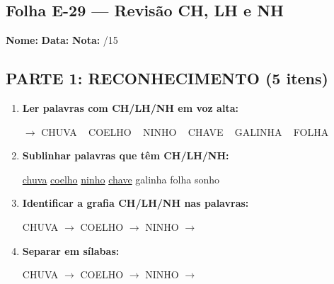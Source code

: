 \subsection{Folha E-29 --- Revisão CH, LH e NH}
\begin{exercicio}



\noindent\textbf{Nome:} \underline{\hspace{3.2cm}} \quad \textbf{Data:} \underline{\hspace{1.6cm}} \quad \textbf{Nota:} \underline{\hspace{0.9cm}}/15


\subsection*{PARTE 1: RECONHECIMENTO (5 itens)}

\begin{enumerate}

  \item \textbf{Ler palavras com CH/LH/NH em voz alta:}
  \begin{center}
  $\rightarrow$ CHUVA ~ COELHO ~ NINHO ~ CHAVE ~ GALINHA ~ FOLHA
  \end{center}

  \item \textbf{Sublinhar palavras que têm CH/LH/NH:}

\begin{center}
  \uline{chuva} \quad \uline{coelho} \quad \uline{ninho} \quad \uline{chave} \quad galinha \quad folha \quad sonho
\end{center}

  \item \textbf{Identificar a grafia CH/LH/NH nas palavras:}
  \begin{center}
  CHUVA $\rightarrow$ \underline{\hspace{1cm}} \quad COELHO $\rightarrow$ \underline{\hspace{1cm}} \quad NINHO $\rightarrow$ \underline{\hspace{1cm}}
  \end{center}

  \item \textbf{Separar em sílabas:}
  \begin{center}
  CHUVA $\rightarrow$ \underline{\hspace{1.2cm}} \quad COELHO $\rightarrow$ \underline{\hspace{1.2cm}} \quad NINHO $\rightarrow$ \underline{\hspace{1.2cm}}
  \end{center}


\end{enumerate}
\end{exercicio}
